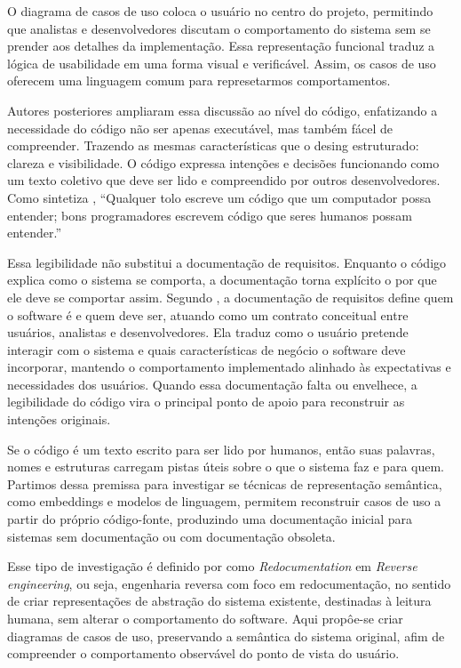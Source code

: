 \documentclass[12pt,a4paper]{article}
\begin{document}
O diagrama de casos de uso coloca o usuário no centro do projeto, permitindo que analistas e desenvolvedores discutam o comportamento do sistema sem se prender aos detalhes da implementação. Essa representação funcional traduz a lógica de usabilidade em uma forma visual e verificável. Assim, os casos de uso oferecem uma linguagem comum para represetarmos comportamentos.

Autores posteriores ampliaram essa discussão ao nível do código, enfatizando a necessidade do código não ser apenas executável, mas também fácel de compreender. Trazendo as mesmas características que o desing estruturado: clareza e visibilidade. O código expressa intenções e decisões funcionando como um texto coletivo que deve ser lido e compreendido por outros desenvolvedores. Como sintetiza \textcite{fowler2018refactoring}, \enquote{Qualquer tolo escreve um código que um computador possa entender; bons programadores escrevem código que seres humanos possam entender.}

Essa legibilidade não substitui a documentação de requisitos. Enquanto o código explica como o sistema se comporta, a documentação torna explícito o por que ele deve se comportar assim. Segundo \textcite{sommerville1997requirements}, a documentação de requisitos define quem o software é e quem deve ser, atuando como um contrato conceitual entre usuários, analistas e desenvolvedores. Ela traduz como o usuário pretende interagir com o sistema e quais características de negócio o software deve incorporar, mantendo o comportamento implementado alinhado às expectativas e necessidades dos usuários. Quando essa documentação falta ou envelhece, a legibilidade do código vira o principal ponto de apoio para reconstruir as intenções originais.

Se o código é um texto escrito para ser lido por humanos, então suas palavras, nomes e estruturas carregam pistas úteis sobre o que o sistema faz e para quem. Partimos dessa premissa para investigar se técnicas de representação semântica, como embeddings e modelos de linguagem, permitem reconstruir casos de uso a partir do próprio código-fonte, produzindo uma documentação inicial para sistemas sem documentação ou com documentação obsoleta.

Esse tipo de investigação é definido por \textcite{chikofsky1990reverse} como \textit{Redocumentation} em \textit{Reverse engineering}, ou seja, engenharia reversa com foco em redocumentação, no sentido de criar representações de abstração do sistema existente, destinadas à leitura humana, sem alterar o comportamento do software. Aqui propôe-se criar diagramas de casos de uso, preservando a semântica do sistema original, afim de compreender o comportamento observável do ponto de vista do usuário.
\end{document}
